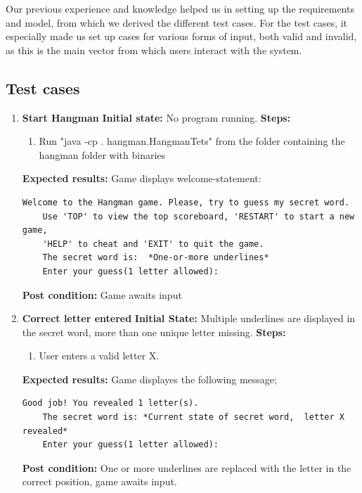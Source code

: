 \documentclass{article}
\begin{document}
	Our previous experience and knowledge helped us in setting up the requirements and model, from which we derived the different test cases. For the test cases, it especially made us set up cases for various forms of input, both valid and invalid, as this is the main vector from which users interact with the system.
\pagebreak

{\small
	\subsection{Test cases}
	\begin{enumerate}
	\setlength\itemsep{0.5cm}

	\item \textbf{Start Hangman}\newline
	\textbf{Initial state:} No program running.\newline
	\textbf{Steps:}
	\begin{enumerate}
	\setlength\itemsep{0.1cm}
	\item Run "java -cp . hangman.HangmanTets" from the folder containing the hangman folder with binaries
	\end{enumerate}
	\textbf{Expected results:} Game displays welcome-statement:
	\begin{lstlisting}[breaklines, gobble=8]
	Welcome to the Hangman game. Please, try to guess my secret word.
	Use 'TOP' to view the top scoreboard, 'RESTART' to start a new game, 
	'HELP' to cheat and 'EXIT' to quit the game.
	The secret word is:  *One-or-more underlines*
	Enter your guess(1 letter allowed):
	\end{lstlisting}
	\textbf{Post condition:} Game awaits input

	\item \textbf{Correct letter entered}\newline
	\textbf{Initial State:} Multiple underlines are displayed in the secret word, more than one unique letter missing.\newline
	\textbf{Steps:}
	\begin{enumerate}
	\item User enters a valid letter X.
	\end{enumerate}
	\textbf{Expected results:} Game displayes the following message; 
	\begin{lstlisting}[breaklines, gobble=8]
	Good job! You revealed 1 letter(s).
	The secret word is: *Current state of secret word,  letter X revealed*
	Enter your guess(1 letter allowed):
	\end{lstlisting}
	\textbf{Post condition:} One or more underlines are replaced with the letter in the correct position, game awaits input.


\end{enumerate}}
\end{document}

